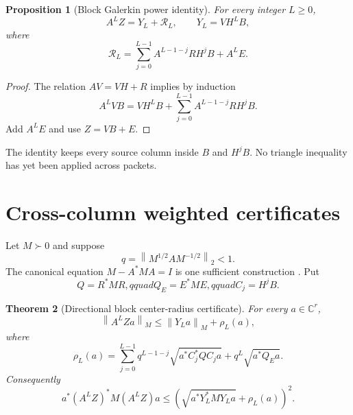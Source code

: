 \documentclass[11pt]{article}
\newtheorem{theorem}{Theorem}[section]
\newtheorem{proposition}[theorem]{Proposition}
\newcommand{\norm}[1]{\left\lVert#1\right\rVert}
\begin{document}
\begin{proposition}[Block Galerkin power identity]
\label{prop:power}
For every integer $L\ge0$,
\begin{equation}
 A^LZ=Y_L+\mathcal R_L,
 \qquad Y_L=VH^LB,
 \label{eq:center}
\end{equation}
where
\begin{equation}
 \mathcal R_L=
 \sum_{j=0}^{L-1}A^{L-1-j}RH^jB+A^LE.
 \label{eq:block-remainder}
\end{equation}
\end{proposition}

\begin{proof}
The relation $AV=VH+R$ implies by induction
\[
 A^LVB=VH^LB+\sum_{j=0}^{L-1}A^{L-1-j}RH^jB.
\]
Add $A^LE$ and use $Z=VB+E$.
\end{proof}

The identity keeps every source column inside $B$ and $H^jB$.  No triangle
inequality has yet been applied across packets.

\section{Cross-column weighted certificates}
\label{sec:certificate}

Let $M\succ0$ and suppose
\begin{equation}
 q=\norm{M^{1/2}AM^{-1/2}}_2<1.
 \label{eq:metric-contraction}
\end{equation}
The canonical equation $M-A^*MA=I$ is one sufficient construction
\citep{ZhouDoyleGlover1996}.  Put
\begin{equation}
 Q=R^*MR,qquad Q_E=E^*ME,qquad C_j=H^jB.
 \label{eq:residual-grams}
\end{equation}

\begin{theorem}[Directional block center-radius certificate]
\label{thm:directional}
For every $a\in\mathbb C^r$,
\begin{equation}
 \norm{A^LZa}_M
 \le \norm{Y_La}_M+\rho_L(a),
 \label{eq:directional-upper}
\end{equation}
where
\begin{equation}
 \rho_L(a)=
 \sum_{j=0}^{L-1}q^{L-1-j}
 \sqrt{a^*C_j^*QC_ja}
 +q^L\sqrt{a^*Q_Ea}.
 \label{eq:directional-radius}
\end{equation}
Consequently
\begin{equation}
 a^*(A^LZ)^*M(A^LZ)a
 \le\left(\sqrt{a^*Y_L^*MY_La}+\rho_L(a)\right)^2.
 \label{eq:directional-energy}
\end{equation}
\end{theorem}
\end{document}
